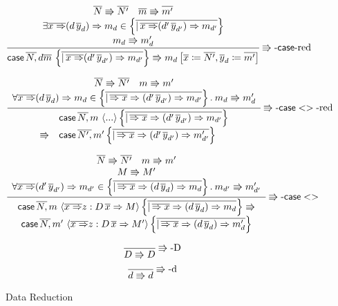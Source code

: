 \begin{figure}
\[
\frac{\begin{array}{c}
\overline{N}\Rrightarrow\overline{N'}\quad\overline{m}\Rrightarrow\overline{m'}\\
\exists\overline{x\Rightarrow}(d\,\overline{y}_{d})\Rightarrow m_{d}\in\left\{ \overline{|\,\overline{x\Rightarrow}(d'\,\overline{y}_{d'})\Rightarrow m_{d'}}\right\} \\
m_{d}\Rrightarrow m_{d}'
\end{array}}{ \mathsf{case}{} \,\overline{N,}\,d\overline{m}\,\left\{ \overline{|\,\overline{x\Rightarrow}(d'\,\overline{y}_{d'})\Rightarrow m_{d'}}\right\} \Rrightarrow m_{d}\left[\overline{x}\coloneqq\overline{N'},\overline{y}_{d}\coloneqq\overline{m'}\right]
} \operatorname{\Rrightarrow-\mathsf{case}{}-red} 
\]

\[
\frac{\begin{array}{c}
\overline{N}\Rrightarrow\overline{N'}\quad m\Rrightarrow m'\\
\forall\overline{x\Rightarrow}(d\,\overline{y}_{d})\Rightarrow m_{d}\in\left\{ \overline{|\,\overline{\Rightarrow x}\Rightarrow(d'\,\overline{y}_{d'})\Rightarrow m_{d'}}\right\} .\:m_{d}\Rrightarrow m_{d}'
\end{array}}{
  \begin{array}{rl}
               & \mathsf{case}{} \,\overline{N,}\,m\,\left\langle ...\right\rangle \left\{ \overline{|\,\overline{\Rightarrow x}\Rightarrow(d'\,\overline{y}_{d'})\Rightarrow m_{d'}}\right\} \\
  \Rrightarrow & \mathsf{case}{} \,\overline{N',}\,m'\left\{ \overline{|\,\overline{\Rightarrow x}\Rightarrow(d'\,\overline{y}_{d'})\Rightarrow m_{d'}'}\right\} 
\end{array}
  } \operatorname{\Rrightarrow-\mathsf{case}{}<>-red} 
\]

\[
\frac{\begin{array}{c}
\overline{N}\Rrightarrow\overline{N'}\quad m\Rrightarrow m'\\
M\Rrightarrow M'\\
\forall\overline{x\Rightarrow}(d'\,\overline{y}_{d'})\Rightarrow m_{d'}\in\left\{ \overline{|\,\overline{\Rightarrow x}\Rightarrow(d\,\overline{y}_{d})\Rightarrow m_{d}}\right\} .\:m_{d'}\Rrightarrow m'_{d'}
\end{array}}{\begin{array}{c}
  \mathsf{case}{} \,\overline{N,}\,m\,\left\langle \overline{x\Rightarrow}z:D\,\overline{x}\Rightarrow M\right\rangle \left\{ \overline{|\,\overline{\Rightarrow x}\Rightarrow(d\,\overline{y}_{d})\Rightarrow m_{d}}\right\} \Rrightarrow\\
  \mathsf{case}{} \,\overline{N,}\,m'\,\left\langle \overline{x\Rightarrow}z:D\,\overline{x}\Rightarrow M'\right\rangle \left\{ \overline{|\,\overline{\Rightarrow x}\Rightarrow(d\,\overline{y}_{d})\Rightarrow m'_{d}}\right\} 
\end{array}
}\operatorname{\Rrightarrow-\mathsf{case}{}<>} 
\]

\[
\frac{\,}{D\Rrightarrow D}\operatorname{\Rrightarrow-D}
\]
\[
\frac{\,}{d\Rrightarrow d}\operatorname{\Rrightarrow-d}
\]
\caption{\SLang{} Data Reduction}
\label{fig:surface-data-red}
\end{figure}

